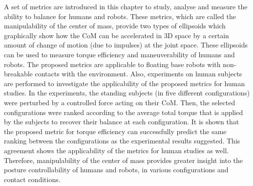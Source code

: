 A set of metrics are introduced in this chapter to study, analyse and measure
the ability to balance for humans and robots.  These metrics, which are called
the manipulability of the center of mass, provide two types of ellipsoids
which graphically show how the CoM can be accelerated in 3D space by a certain
amount of change of motion (due to impulses) at the joint space.  These
ellipsoids can be used to measure torque efficiency and maneuverability of
humans and robots.  The proposed metrics are applicable to floating base
robots with non-breakable contacts with the environment.  Also, experiments on
human subjects are performed to investigate the applicability of the proposed
metrics for human studies.  In the experiments, the standing subjects (in five
different configurations) were perturbed by a controlled force acting on their
CoM.  Then, the selected configurations were ranked according to the average
total torque that is applied by the subjects to recover their balance at each
configuration.  It is shown that the proposed metric for torque efficiency can
successfully predict the same ranking between the configurations as the
experimental results suggested.  This agreement shows the applicability of the
metrics for human studies as well.  Therefore, manipulability of the center of
mass provides greater insight into the posture controllability of humans and
robots, in various configurations and contact conditions.







